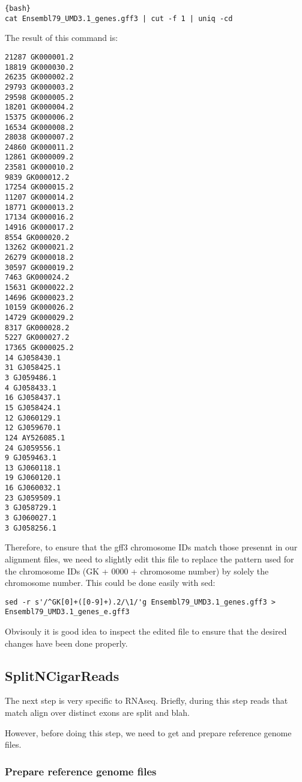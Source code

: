 \begin{verbatim}{bash}
cat Ensembl79_UMD3.1_genes.gff3 | cut -f 1 | uniq -cd
\end{verbatim}


The result of this command is:
\begin{verbatim}
21287 GK000001.2
18819 GK000030.2
26235 GK000002.2
29793 GK000003.2
29598 GK000005.2
18201 GK000004.2
15375 GK000006.2
16534 GK000008.2
28038 GK000007.2
24860 GK000011.2
12861 GK000009.2
23581 GK000010.2
9839 GK000012.2
17254 GK000015.2
11207 GK000014.2
18771 GK000013.2
17134 GK000016.2
14916 GK000017.2
8554 GK000020.2
13262 GK000021.2
26279 GK000018.2
30597 GK000019.2
7463 GK000024.2
15631 GK000022.2
14696 GK000023.2
10159 GK000026.2
14729 GK000029.2
8317 GK000028.2
5227 GK000027.2
17365 GK000025.2
14 GJ058430.1
31 GJ058425.1
3 GJ059486.1
4 GJ058433.1
16 GJ058437.1
15 GJ058424.1
12 GJ060129.1
12 GJ059670.1
124 AY526085.1
24 GJ059556.1
9 GJ059463.1
13 GJ060118.1
19 GJ060120.1
16 GJ060032.1
23 GJ059509.1
3 GJ058729.1
3 GJ060027.1
3 GJ058256.1
\end{verbatim}

Therefore, to ensure that the gff3 chromosome IDs match those presennt in our alignment files, we need to slightly edit this file to replace the pattern used for the chromosome IDs (GK + 0000 + chromosome number) by solely the chromosome number. This could be done easily with sed:

\begin{verbatim}
sed -r s'/^GK[0]+([0-9]+).2/\1/'g Ensembl79_UMD3.1_genes.gff3 > Ensembl79_UMD3.1_genes_e.gff3
\end{verbatim}

Obvisouly it is good idea to inspect the edited file to ensure that the desired changes have been done properly.

\subsection{SplitNCigarReads}

The next step is very specific to RNAseq. Briefly, during this step reads that match align over distinct exons are split and blah.

However, before doing this step, we need to get and prepare reference genome files.

\subsubsection{Prepare reference genome files}

